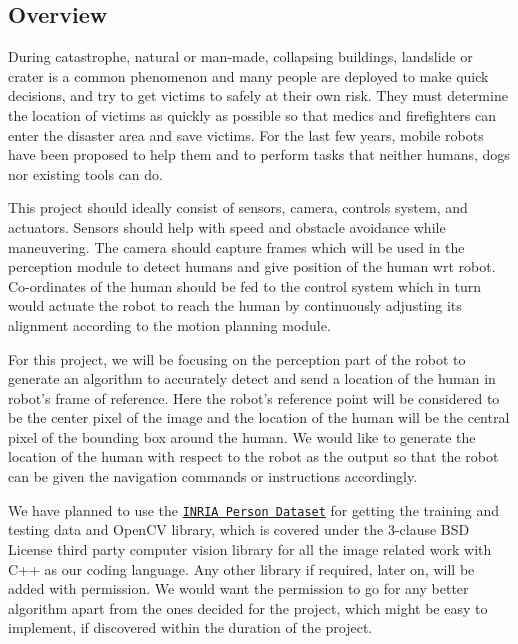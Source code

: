 \href{https://travis-ci.org/kamakshijain/HUMAN-DETECTION}{\tt } \href{https://coveralls.io/github/kamakshijain/HUMAN-DETECTION?branch=master}{\tt } \subsection*{\href{https://opensource.org/licenses/MIT}{\tt } }

\subsection*{Overview}

During catastrophe, natural or man-\/made, collapsing buildings, landslide or crater is a common phenomenon and many people are deployed to make quick decisions, and try to get victims to safely at their own risk. They must determine the location of victims as quickly as possible so that medics and firefighters can enter the disaster area and save victims. For the last few years, mobile robots have been proposed to help them and to perform tasks that neither humans, dogs nor existing tools can do.

This project should ideally consist of sensors, camera, controls system, and actuators. Sensors should help with speed and obstacle avoidance while maneuvering. The camera should capture frames which will be used in the perception module to detect humans and give position of the human wrt robot. Co-\/ordinates of the human should be fed to the control system which in turn would actuate the robot to reach the human by continuously adjusting its alignment according to the motion planning module.

For this project, we will be focusing on the perception part of the robot to generate an algorithm to accurately detect and send a location of the human in robot’s frame of reference. Here the robot’s reference point will be considered to be the center pixel of the image and the location of the human will be the central pixel of the bounding box around the human. We would like to generate the location of the human with respect to the robot as the output so that the robot can be given the navigation commands or instructions accordingly.

We have planned to use the \href{http://pascal.inrialpes.fr/data/human/}{\tt I\+N\+R\+IA Person Dataset} for getting the training and testing data and Open\+CV library, which is covered under the 3-\/clause B\+SD License third party computer vision library for all the image related work with C++ as our coding language. Any other library if required, later on, will be added with permission. We would want the permission to go for any better algorithm apart from the ones decided for the project, which might be easy to implement, if discovered within the duration of the project.

